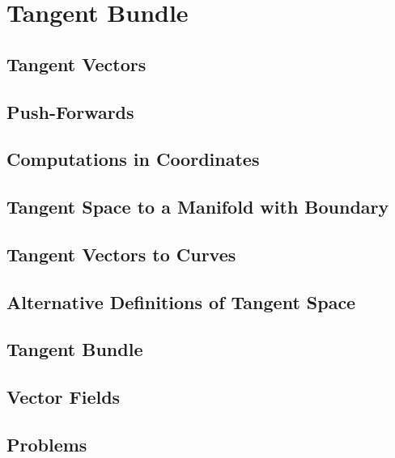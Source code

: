 \chapter{Tangent Bundle}
\section{Tangent Vectors}
\section{Push-Forwards}
\section{Computations in Coordinates}
\section{Tangent Space to a Manifold with Boundary}
\section{Tangent Vectors to Curves}
\section{Alternative Definitions of Tangent Space}
\section{Tangent Bundle}
\section{Vector Fields}
\section{Problems}